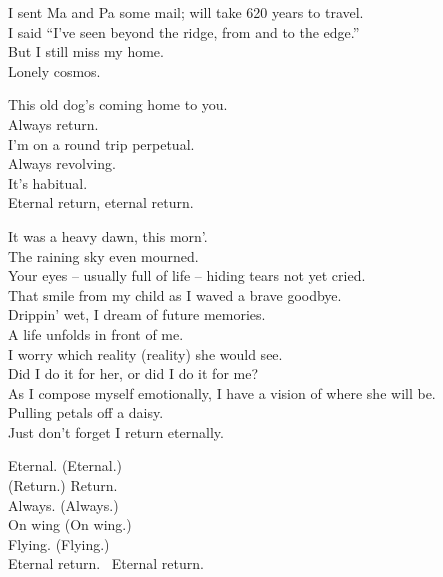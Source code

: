 
I sent Ma and Pa some mail; will take 620 years to travel. \\
I said ``I've seen beyond the ridge, from  and to the edge.'' \\
But I still miss my home. \\
Lonely cosmos. \\




This old dog's coming home to you. \\
Always return. \\
I'm on a round trip perpetual. \\
Always revolving. \\
It's habitual. \\
Eternal return, eternal return. \\


It was a heavy dawn, this morn'. \\
The raining sky even mourned. \\
Your eyes -- usually full of life -- hiding tears not yet cried. \\
That smile from my child as I waved a brave goodbye. \\
Drippin' wet, I dream of future memories. \\
A life unfolds in front of me. \\

I worry which reality (reality) she would see. \\
Did I do it for her, or did I do it for me? \\
As I compose myself emotionally, I have a vision of where she will be. \\
Pulling petals off a daisy. \\
Just don't forget I return eternally. \\


Eternal. (Eternal.) \\
(Return.) Return. \\
Always. (Always.) \\
On wing (On wing.) \\
Flying. (Flying.) \\
Eternal return. \
Eternal return. \\

